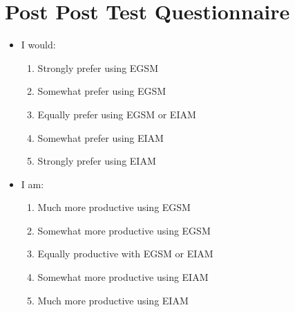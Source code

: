 \chapter{Post Post Test Questionnaire}


\begin {itemize}
\item I would:
    \begin{enumerate}
    \item Strongly prefer using EGSM
    \item Somewhat prefer using EGSM
    \item Equally prefer using EGSM or EIAM
    \item Somewhat prefer using EIAM
    \item Strongly prefer using EIAM
    \end{enumerate}

\item I am:
    \begin{enumerate}
      \item Much more productive using EGSM
      \item Somewhat more productive using EGSM
       \item Equally productive with EGSM or EIAM
      \item Somewhat more productive using EIAM
      \item Much more productive using EIAM
     \end{enumerate}   
\end{itemize}


